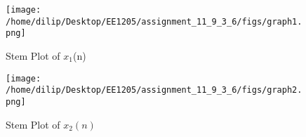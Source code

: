 \documentclass[journal,12pt,twocolumn]{IEEEtran}
\theoremstyle{remark}
\begin{document}
\begin{figure}[h]
    \renewcommand\thefigure{1}
    \centering
    \captionsetup{justification=centering}
    \texttt{[image: /home/dilip/Desktop/EE1205/assignment\_11\_9\_3\_6/figs/graph1.png]}
    \caption{Stem Plot of $x_1$(n)}
    \label{stemplot1}
\end{figure}
\begin{figure}[h]
    \renewcommand\thefigure{2}
    \centering
    \captionsetup{justification=centering}
    \texttt{[image: /home/dilip/Desktop/EE1205/assignment\_11\_9\_3\_6/figs/graph2.png]}
    \caption{Stem Plot of $x_2(n)$}
    \label{stemplot2}
\end{figure}
\end{document}
